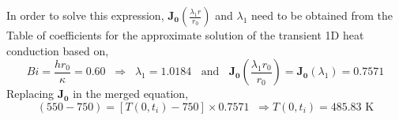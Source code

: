 \documentclass[calculator,datasheet,handbook,solutions]{exam}
\begin{document}
\begin{question}
\begin{enumerate}[a)]
{\begin{displaymath}
        \end{displaymath}
In order to solve this expression, $\mathbf{J_{0}}\left(\frac{\lambda_{1}r}{r_{0}}\right)$ and $\lambda_{1}$ need to be obtained from the Table of coefficients for the approximate solution of the transient 1D heat conduction based on,
       \begin{displaymath}
           Bi = \frac{h r_{0}}{\kappa} = 0.60 \;\;\Rightarrow \;\; \lambda_{1} = 1.0184\;\;\text{ and }\;\; \mathbf{J_{0}}\left(\frac{\lambda_{1}r_{0}}{r_{0}}\right) = \mathbf{J_{0}}\left(\lambda_{1}\right) = 0.7571
       \end{displaymath} 
Replacing $\mathbf{J_{0}}$ in the merged equation, 
       \begin{displaymath}
           (550-750) = \left[T\left(0,t_{i}\right)-750\right] \times 0.7571 \;\;\Rightarrow T\left(0,t_{i}\right) = 485.83\text{ K}
       \end{displaymath} 
    
    




}

  \end{enumerate}
\end{question}

\pagebreak


% 
\paperend
\end{document}
